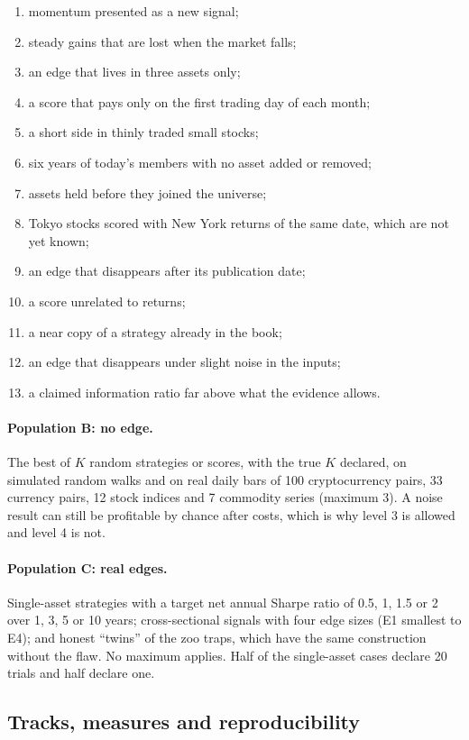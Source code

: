 \documentclass[11pt]{article}
\begin{document}
\begin{enumerate}
\item momentum presented as a new signal;
\item steady gains that are lost when the market falls;
\item an edge that lives in three assets only;
\item a score that pays only on the first trading day of each month;
\item a short side in thinly traded small stocks;
\item six years of today's members with no asset added or removed;
\item assets held before they joined the universe;
\item Tokyo stocks scored with New York returns of the same date, which are not yet known;
\item an edge that disappears after its publication date;
\item a score unrelated to returns;
\item a near copy of a strategy already in the book;
\item an edge that disappears under slight noise in the inputs;
\item a claimed information ratio far above what the evidence allows.
\end{enumerate}

\paragraph{Population B: no edge.} The best of $K$ random strategies or scores, with the true $K$ declared, on simulated
random walks and on real daily bars of 100 cryptocurrency pairs, 33 currency pairs, 12 stock indices and 7 commodity
series (maximum 3). A noise result can still be profitable by chance after costs, which is why level 3 is allowed and
level 4 is not.

\paragraph{Population C: real edges.} Single-asset strategies with a target net annual Sharpe ratio of 0.5, 1, 1.5 or 2
over 1, 3, 5 or 10 years; cross-sectional signals with four edge sizes (E1 smallest to E4); and honest ``twins'' of the
zoo traps, which have the same construction without the flaw. No maximum applies. Half of the single-asset cases declare
20 trials and half declare one.

\subsection{Tracks, measures and reproducibility}
\end{document}
